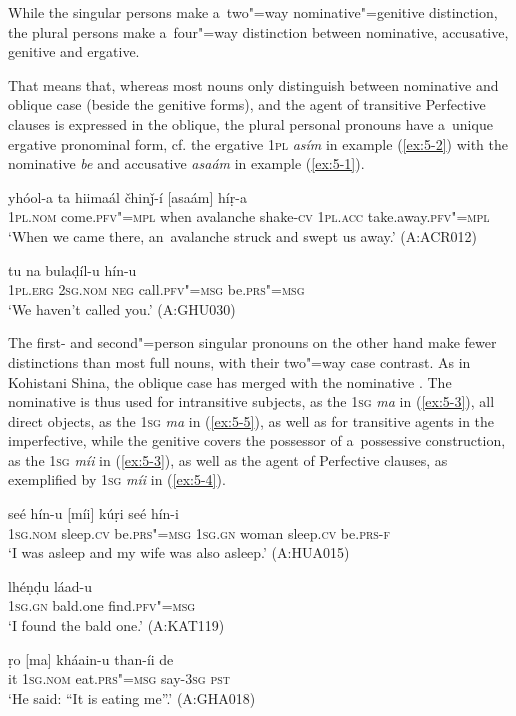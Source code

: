While the singular persons make a~two"=way nominative"=genitive distinction, the plural persons make a~four"=way distinction between nominative, accusative, genitive and ergative.


That means that, whereas most nouns only distinguish between nominative and oblique case (beside the genitive forms), and the agent of transitive Perfective clauses is expressed in the oblique, the plural personal pronouns have a~unique ergative pronominal form, cf. the ergative \textsc{1pl} \textit{asím} in example (\ref{ex:5-2}) with the nominative \textit{be} and accusative \textit{asaám} in example (\ref{ex:5-1}). 

\begin{exe}
\ex
\label{ex:5-1}
\gll [be] yhóol-a ta hiimaál čhinǰ-í [asaám] híṛ-a \\
\textsc{1pl.nom} come.\textsc{pfv"=mpl} when avalanche shake\textsc{-cv} \textsc{1pl.acc} take.away.\textsc{pfv"=mpl} \\
\glt `When we came there, an~avalanche struck and swept us away.' (A:ACR012)

\ex
\label{ex:5-2}
\gll [asím] tu na bulaḍíl-u hín-u \\
	\textsc{1pl.erg} \textsc{2sg.nom} \textsc{neg} call.\textsc{pfv"=msg} be.\textsc{prs"=msg} \\
\glt `We haven't called you.' (A:GHU030)
\end{exe}

The first- and second"=person singular pronouns on the other hand make fewer distinctions than most full nouns, with their two"=way case contrast. As in Kohistani Shina, the oblique case has merged with the nominative \citep[82]{schmidtkohistani2008}. The nominative is thus used for intransitive subjects, as the \textsc{1sg} \textit{ma} in (\ref{ex:5-3}), all direct objects, as the \textsc{1sg} \textit{ma} in (\ref{ex:5-5}), as well as for transitive agents in the imperfective, while the genitive covers the possessor of a~possessive construction, as the \textsc{1sg} \textit{míi} in (\ref{ex:5-3}), as well as the agent of Perfective clauses, as exemplified by \textsc{1sg} \textit{míi} in (\ref{ex:5-4}). 


\begin{exe}
\ex
\label{ex:5-3}
\gll [ma] seé hín-u [míi] kúṛi seé hín-i \\
	\textsc{1sg.nom} sleep.\textsc{cv} be.\textsc{prs"=msg} \textsc{1sg.gn} woman sleep.\textsc{cv} be.\textsc{prs-f} \\
\glt `I was asleep and my wife was also asleep.' (A:HUA015)

\ex
\label{ex:5-4}
\gll [míi] lhéṇḍu láad-u \\
	\textsc{1sg.gn} bald.one find.\textsc{pfv"=msg} \\
\glt `I found the bald one.' (A:KAT119)

\ex
\label{ex:5-5}
\gll ṛo [ma] kháain-u than-íi de \\
	it \textsc{1sg.nom} eat.\textsc{prs"=msg} say-\textsc{3sg} \textsc{pst} \\
\glt `He said: ``It is eating me''.' (A:GHA018)
\end{exe}

